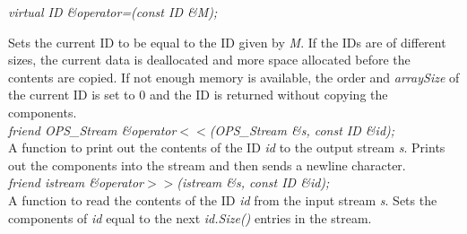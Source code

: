 {\em virtual ID \&operator=(const ID \&M);}

Sets the current ID to be equal to the ID given by {\em M}. If the
IDs are of different sizes, the current data is deallocated and
more space allocated before the contents are copied. If not enough
memory is available, the order and {\em arraySize} of the current ID
is set to $0$ and the ID is returned without copying the components. \\


{\em friend OPS_Stream \&operator$<<$(OPS_Stream \&s, const ID \&id);} \\
A function to print out the contents of the ID {\em id} to the output stream
{\em s}. Prints out the components into the stream and then sends a
newline character. \\

{\em friend istream \&operator$>>$(istream \&s, const ID \&id);} \\
A function to read the contents of the ID {\em id} from the input
stream {\em s}. Sets the components of {\em id} equal to the next {\em
id.Size()} entries in the stream.\\ 






